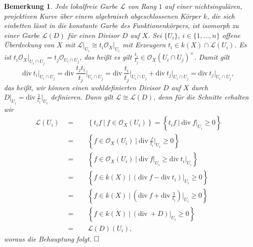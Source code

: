 \documentclass[11pt]{book}
\newtheorem{remark}[theorem]{Bemerkung}
\theoremstyle{nonumberbreak}
\newenvironment{pr}[1][]{\ifthenelse{\equal{#1}{}}{\proof}{\proof[#1]}\rm}{\endproof}
\begin{document}
\begin{spacing}{1.4}
\begin{remark}   %
Jede lokalfreie Garbe $\mathcal{L}$ von Rang $1$ auf einer nichtsingulären, projektiven Kurve über einem algebraisch abgeschlossenen Körper $k$, die sich einbetten lässt in die konstante Garbe des Funktionenkörpers, ist isomorph zu einer Garbe $\mathcal{L}(D)$ für einen Divisor $D$ auf $X$.
\begin{pr}
Sei $\{U_i\}$, $i \in \{1, \ldots, n \}$ offene Überdeckung von $X$ mit $\mathcal{L}\vert_{U_i} \cong t_i \mathcal{O}_X \vert_{U_i}$ mit Erzeugern $t_i \in k(X) \cap \mathcal{L}(U_i)$. Es ist $t_i \mathcal{O}_X \vert_{U_i \cap U_j} = t_j \mathcal{O}_{U_i \cap U_j}$, das heißt es gilt $\frac{t_i}{t_j} \in \mathcal{O}_X( U_i \cap U_j)^{\times}$. Damit gilt 
$$\mathrm{div\ } t_i\vert_{U_i \cap U_j} = \mathrm{div\ } \frac{t_jt_i}{t_j} \bigg\vert_{U_i \cap U_j} = \mathrm{div\ } \frac{t_i}{t_j} \bigg\vert_{U_i \cap U_j} + \mathrm{div\ } t_j \vert_{U_i \cap U_j} = \mathrm{div\ }t_j \vert_{U_i \cap U_j},$$
das heißt, wir können einen wohldefinierten Divisor $D$ auf $X$ durch $D\vert_{U_i} = \mathrm{div\ } \frac{1}{t_i} \bigg\vert_{U_i}$ definieren. Dann gilt $\mathcal{L} \cong \mathcal{L}(D)$, denn für die Schnitte erhalten wir
\setlength{\abovedisplayskip}{5.5pt}
\setlength{\belowdisplayskip}{5.5pt}
\begin{alignat*}{5}
\mathcal{L}(U_i) \ \ &=&& \ \ \left\{t_i f \ \vert \ f \in \mathcal{O}_X(U_i) \right\} = \left\{ t_i f \ \vert \ \mathrm{div\ }f\vert_{U_i} \geqslant 0\right\}\\
&=&& \ \ \left\{ f \in \mathcal{O}_X(U_i) \ \vert \ \mathrm{div\ }\frac{f}{t_i} \bigg\vert_{U_i} \geqslant 0 \right\}\\
&=&& \ \ \left\{ f \in \mathcal{O}_X(U_i) \ \vert \ \mathrm{div\ }f  \vert_{U_i} \geqslant \mathrm{div\ }t_i \vert_{U_i} \right\}\\
&=&& \ \ \left\{ f \in k(X) \ \vert \ \left( \mathrm{div\ } f - \mathrm{div\ } t_i \right) \vert_{U_i} \geqslant 0 \right\}\\
&=&& \ \ \left\{f \in k(X) \ \vert \ \left( \mathrm{div\ } f +\mathrm{div\ } \frac{1}{t_i} \right) \bigg\vert_{U_i} \geqslant0\right\}\\
&=&& \ \ \left\{ f \in k(X) \ \vert \ \left( \mathrm{div\ } + D\right) \vert_{U_i} \geqslant 0 \right\}\\
&=&& \ \ \mathcal{L}(D)(U_i),
\end{alignat*}
woraus die Behauptung folgt. $\hfill \Box$

\end{pr}
\end{remark}



\end{spacing}
\end{document}
